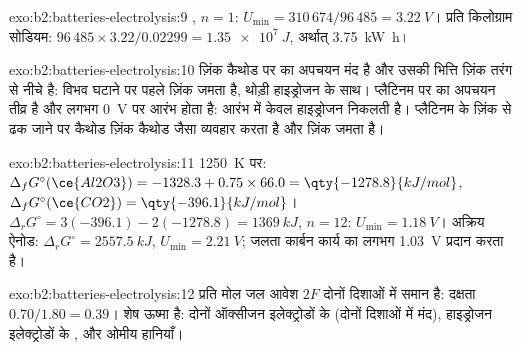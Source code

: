 \begin{solution}{exo:b2:batteries-electrolysis:9}
, $n = 1$: $U_{\min} = 310\,674/96\,485 = \qty{3.22}{V}$।
प्रति किलोग्राम सोडियम: $96\,485 \times 3.22/0.02299 = \qty{1.35e7}{J}$, अर्थात्
\qty{3.75}{kW.h}।
\end{solution}

\begin{solution}{exo:b2:batteries-electrolysis:10}
ज़िंक कैथोड पर  का अपचयन मंद है और उसकी भित्ति ज़िंक
तरंग से नीचे है: विभव घटाने पर पहले ज़िंक जमता है, थोड़ी
हाइड्रोजन के साथ। प्लैटिनम पर  का अपचयन तीव्र है और लगभग
\qty{0}{V} पर आरंभ होता है: आरंभ में केवल हाइड्रोजन निकलती है। प्लैटिनम के
ज़िंक से ढक जाने पर कैथोड ज़िंक कैथोड जैसा व्यवहार करता है और ज़िंक जमता है।
\end{solution}

\begin{solution}{exo:b2:batteries-electrolysis:11}
\qty{1250}{K} पर: $\Delta_f G^\circ(\ce{Al2O3}) = -1328.3 + 0.75 \times 66.0 =
\qty{-1278.8}{kJ/mol}$, $\Delta_f G^\circ(\ce{CO2}) = \qty{-396.1}{kJ/mol}$। $\Delta_r G^\circ =
3(-396.1) - 2(-1278.8) = \qty{1369}{kJ}$, $n = 12$: $U_{\min} = \qty{1.18}{V}$। अक्रिय ऐनोड:
$\Delta_r G^\circ = \qty{2557.5}{kJ}$, $U_{\min} = \qty{2.21}{V}$; जलता कार्बन
कार्य का लगभग \qty{1.03}{V} प्रदान करता है।
\end{solution}

\begin{solution}{exo:b2:batteries-electrolysis:12}
प्रति मोल जल आवेश $2F$ दोनों दिशाओं में समान है: दक्षता $0.70/1.80 =
0.39$। शेष ऊष्मा है: दोनों ऑक्सीजन इलेक्ट्रोडों के  (दोनों
दिशाओं में मंद), हाइड्रोजन इलेक्ट्रोडों के , और ओमीय हानियाँ।
\end{solution}

